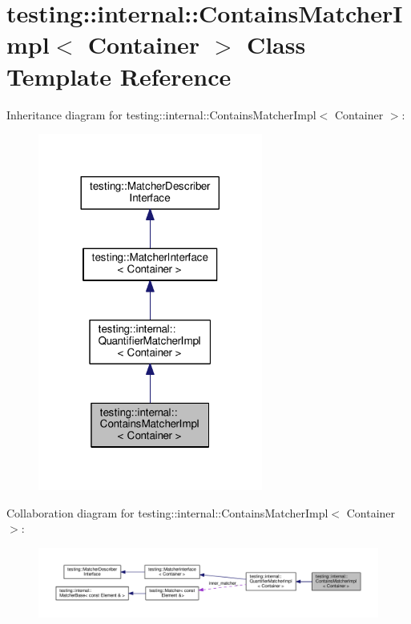 \hypertarget{classtesting_1_1internal_1_1_contains_matcher_impl}{}\section{testing\+:\+:internal\+:\+:Contains\+Matcher\+Impl$<$ Container $>$ Class Template Reference}
\label{classtesting_1_1internal_1_1_contains_matcher_impl}


Inheritance diagram for testing\+:\+:internal\+:\+:Contains\+Matcher\+Impl$<$ Container $>$\+:
\nopagebreak
\begin{figure}[H]
\begin{center}
\leavevmode
\includegraphics[width=209pt]{classtesting_1_1internal_1_1_contains_matcher_impl__inherit__graph}
\end{center}
\end{figure}


Collaboration diagram for testing\+:\+:internal\+:\+:Contains\+Matcher\+Impl$<$ Container $>$\+:
\nopagebreak
\begin{figure}[H]
\begin{center}
\leavevmode
\includegraphics[width=350pt]{classtesting_1_1internal_1_1_contains_matcher_impl__coll__graph}
\end{center}
\end{figure}
